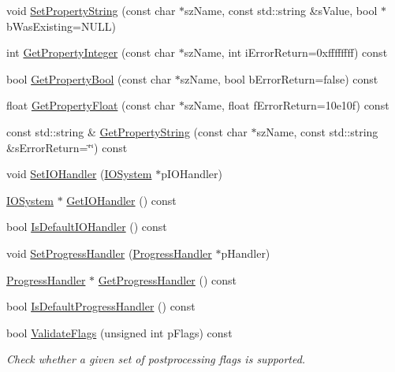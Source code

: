 \begin{DoxyCompactItemize}
void \hyperlink{class_assimp_1_1_importer_a8f79ecb5c6f67a76fc87654c32986e8e}{Set\-Property\-String} (const char $\ast$sz\-Name, const std\-::string \&s\-Value, bool $\ast$b\-Was\-Existing=N\-U\-L\-L)
\item 
int \hyperlink{class_assimp_1_1_importer_a3e796a0758a9f10f13107f44c542ad41}{Get\-Property\-Integer} (const char $\ast$sz\-Name, int i\-Error\-Return=0xffffffff) const 
\item 
bool \hyperlink{class_assimp_1_1_importer_a90f5d35d25e5d2a0ef8bc0c6545b2010}{Get\-Property\-Bool} (const char $\ast$sz\-Name, bool b\-Error\-Return=false) const 
\item 
float \hyperlink{class_assimp_1_1_importer_a9a99a3467d6386ddcfbe2823f16b6640}{Get\-Property\-Float} (const char $\ast$sz\-Name, float f\-Error\-Return=10e10f) const 
\item 
const std\-::string \& \hyperlink{class_assimp_1_1_importer_a4d64ee7131d6c26dc9688de85d142f14}{Get\-Property\-String} (const char $\ast$sz\-Name, const std\-::string \&s\-Error\-Return=\char`\"{}\char`\"{}) const 
\item 
void \hyperlink{class_assimp_1_1_importer_a1161f46318af18bb86dfe0fc3edea4df}{Set\-I\-O\-Handler} (\hyperlink{class_assimp_1_1_i_o_system}{I\-O\-System} $\ast$p\-I\-O\-Handler)
\item 
\hyperlink{class_assimp_1_1_i_o_system}{I\-O\-System} $\ast$ \hyperlink{class_assimp_1_1_importer_abe3af30f4c5eae2e875b0f32068be44d}{Get\-I\-O\-Handler} () const 
\item 
bool \hyperlink{class_assimp_1_1_importer_ae3f26466cf7756594216ffedbc247563}{Is\-Default\-I\-O\-Handler} () const 
\item 
void \hyperlink{class_assimp_1_1_importer_a6a4d830ffb3f77a3c7c919e0af006920}{Set\-Progress\-Handler} (\hyperlink{class_assimp_1_1_progress_handler}{Progress\-Handler} $\ast$p\-Handler)
\item 
\hyperlink{class_assimp_1_1_progress_handler}{Progress\-Handler} $\ast$ \hyperlink{class_assimp_1_1_importer_a1fa669f0edc504fdf9178e8e22c728ad}{Get\-Progress\-Handler} () const 
\item 
bool \hyperlink{class_assimp_1_1_importer_a2d60d970eddf8f9d35b6e9b54214cedd}{Is\-Default\-Progress\-Handler} () const 
\item 
bool \hyperlink{class_assimp_1_1_importer_a780329e2dd0406e930291cf8ab9deb99}{Validate\-Flags} (unsigned int p\-Flags) const 
\begin{DoxyCompactList}\small\item\em Check whether a given set of postprocessing flags is supported. \end{DoxyCompactList}\item 

\end{DoxyCompactItemize}
